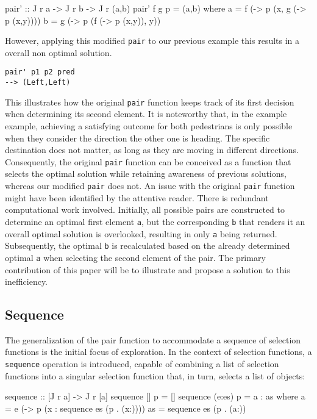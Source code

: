\documentclass[runningheads]{llncs}
\begin{document}
\begin{code}
pair' :: J r a -> J r b -> J r (a,b)
pair' f g p = (a,b)
  where
      a = f (\x -> p (x, g (\y -> p (x,y))))
      b = g (\y -> p (f (\x -> p (x,y)), y))
\end{code}

However, applying this modified \texttt{pair\textquotesingle{}} to our
previous example this results in a overall non optimal solution.

\begin{verbatim}
pair' p1 p2 pred
--> (Left,Left)
\end{verbatim}

This illustrates how the original \texttt{pair} function keeps track of
its first decision when determining its second element. It is noteworthy
that, in the example example, achieving a satisfying outcome for both
pedestrians is only possible when they consider the direction the other
one is heading. The specific destination does not matter, as long as
they are moving in different directions. Consequently, the original
\texttt{pair} function can be conceived as a function that selects the
optimal solution while retaining awareness of previous solutions,
whereas our modified \texttt{pair\textquotesingle{}} does not. An issue
with the original \texttt{pair} function might have been identified by
the attentive reader. There is redundant computational work involved.
Initially, all possible pairs are constructed to determine an optimal
first element \texttt{a}, but the corresponding \texttt{b} that renders
it an overall optimal solution is overlooked, resulting in only
\texttt{a} being returned. Subsequently, the optimal \texttt{b} is
recalculated based on the already determined optimal \texttt{a} when
selecting the second element of the pair. The primary contribution of
this paper will be to illustrate and propose a solution to this
inefficiency.

\subsection{Sequence}\label{sequence}

The generalization of the pair function to accommodate a sequence of
selection functions is the initial focus of exploration. In the context
of selection functions, a \texttt{sequence} operation is introduced,
capable of combining a list of selection functions into a singular
selection function that, in turn, selects a list of objects:

\begin{code}
sequence :: [J r a] -> J r [a]
sequence [] p     = []
sequence (e:es) p = a : as
  where 
      a  = e (\x -> p (x : sequence es (p . (x:))))
      as = sequence es (p . (a:))
\end{code}
\end{document}
